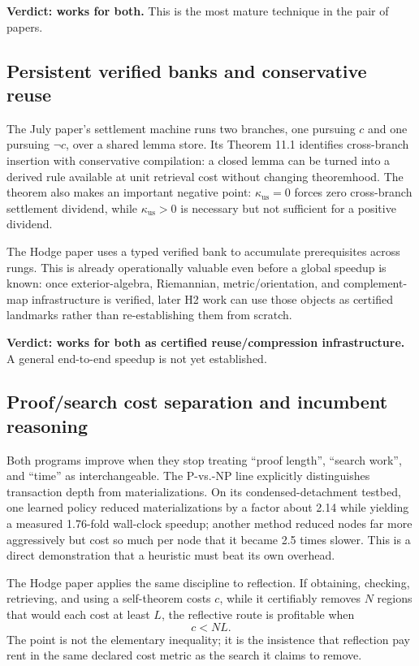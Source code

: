 \documentclass[11pt]{article}
\newcommand{\kuse}{\kappa_{\mathrm{us}}}
\begin{document}
\textbf{Verdict: works for both.}  This is the most mature technique in the pair of papers.

\subsection{Persistent verified banks and conservative reuse}

The July paper's settlement machine runs two branches, one pursuing \(c\) and one pursuing \(\neg c\), over a shared lemma store.  Its Theorem 11.1 identifies cross-branch insertion with conservative compilation: a closed lemma can be turned into a derived rule available at unit retrieval cost without changing theoremhood.  The theorem also makes an important negative point: \(\kuse=0\) forces zero cross-branch settlement dividend, while \(\kuse>0\) is necessary but not sufficient for a positive dividend.

The Hodge paper uses a typed verified bank to accumulate prerequisites across rungs.  This is already operationally valuable even before a global speedup is known: once exterior-algebra, Riemannian, metric/orientation, and complement-map infrastructure is verified, later H2 work can use those objects as certified landmarks rather than re-establishing them from scratch.

\textbf{Verdict: works for both as certified reuse/compression infrastructure.}  A general end-to-end speedup is not yet established.

\subsection{Proof/search cost separation and incumbent reasoning}

Both programs improve when they stop treating ``proof length'', ``search work'', and ``time'' as interchangeable.  The P-vs.-NP line explicitly distinguishes transaction depth from materializations.  On its condensed-detachment testbed, one learned policy reduced materializations by a factor about 2.14 while yielding a measured 1.76-fold wall-clock speedup; another method reduced nodes far more aggressively but cost so much per node that it became 2.5 times slower.  This is a direct demonstration that a heuristic must beat its own overhead.

The Hodge paper applies the same discipline to reflection.  If obtaining, checking, retrieving, and using a self-theorem costs \(c\), while it certifiably removes \(N\) regions that would each cost at least \(L\), the reflective route is profitable when
\[
 c < NL.
\]
The point is not the elementary inequality; it is the insistence that reflection pay rent in the same declared cost metric as the search it claims to remove.
\end{document}
